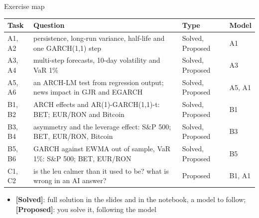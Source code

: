 \begin{frame}{Exercise map}
\itemsize{\small}
\begin{center}
\footnotesize
\begin{tabular}{>{\raggedright\arraybackslash}p{1.1cm}>{\raggedright\arraybackslash}p{7.5cm}>{\raggedright\arraybackslash}p{1.9cm}>{\raggedright\arraybackslash}p{1.4cm}}
\toprule
\textbf{Task} & \textbf{Question} & \textbf{Type} & \textbf{Model} \\
\midrule
A1, A2 & persistence, long-run variance, half-life and one GARCH(1,1) step & Solved, Proposed & A1 \\
A3, A4 & multi-step forecasts, 10-day volatility and VaR 1\% & Solved, Proposed & A3 \\
A5, A6 & an ARCH-LM test from regression output; news impact in GJR and EGARCH & Solved, Proposed & A5, A1 \\
B1, B2 & ARCH effects and AR(1)-GARCH(1,1)-t: BET; EUR/RON and Bitcoin & Solved, Proposed & B1 \\
B3, B4 & asymmetry and the leverage effect: S\&P 500; BET, EUR/RON, Bitcoin & Solved, Proposed & B3 \\
B5, B6 & GARCH against EWMA out of sample, VaR 1\%: S\&P 500; BET, EUR/RON & Solved, Proposed & B5 \\
C1, C2 & is the leu calmer than it used to be? what is wrong in an AI answer? & Proposed & B1, A1 \\
\bottomrule
\end{tabular}
\end{center}
\begin{itemize}
    \item \textbf{[Solved]}: full solution in the slides and in the notebook, a model to follow; \textbf{[Proposed]}: you solve it, following the model
\end{itemize}
\end{frame}

